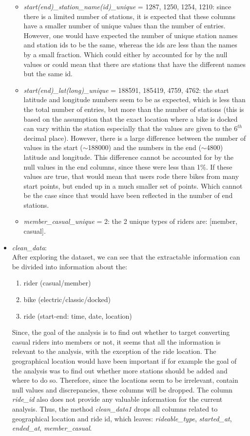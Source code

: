 \documentclass[12pt]{article}
\begin{document}
\begin{itemize}
\begin{itemize}
	\item \textit{start(end)\_station\_name(id)\_unique} = 1287, 1250, 1254, 1210: since there is a limited number of stations, it is expected that these columns have a smaller number of unique values than the number of entries. However, one would have expected the number of unique station names and station ids to be the same, whereas the ids are less than the names by a small fraction. Which could either by accounted for by the null values or could mean that there are stations that have the different names but the same id.
	\item \textit{start(end)\_lat(long)\_unique} = 188591, 185419, 4759, 4762: the start latitude and longitude numbers seem to be as expected, which is less than the total number of entries, but more than the number of stations (this is based on the assumption that the exact location where a bike is docked can vary within the station especially that the values are given to the $6^{th}$ decimal place). However, there is a large difference between the number of values in the start ($\sim$188000) and the numbers in the end ($\sim$4800) latitude and longitude. This difference cannot be accounted for by the null values in the end columns, since these were less than 1\%. If these values are true, that would mean that users rode there bikes from many start points, but ended up in a much smaller set of points. Which cannot be the case since that would have been reflected in the number of end stations. 
	\item \textit{member\_casual\_unique} = 2: the 2 unique types of riders are: [member, casual].
\end{itemize}
	
	\item \textit{clean\_data}:\\
	After exploring the dataset, we can see that the extractable information can be divided into information about the:
	\begin{enumerate} 
	\item rider (casual/member)
	\item bike (electric/classic/docked)
	\item ride (start-end: time, date, location)
	\end{enumerate}
Since, the goal of the analysis is to find out whether to target converting casual riders into members or not, it seems that all the information is relevant to the analysis, with the exception of the ride location. The geographical location would have been important if for example the goal of the analysis was to find out whether more stations should be added and where to do so. Therefore, since the locations seem to be irrelevant, contain null values and discrepancies, these columns will be dropped. The column \textit{ride\_id} also does not provide any valuable information for the current analysis. Thus, the method \textit{clean\_data1} drops all columns related to geographical location and ride id, which leaves: \textit{rideable\_type}, \textit{started\_at}, \textit{ended\_at}, \textit{member\_casual}. 



\end{itemize}
\end{document}
